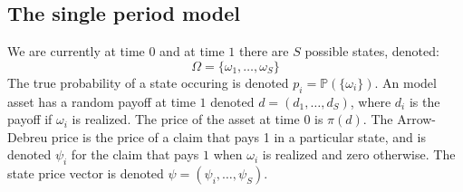 \documentclass[10pt,a4paper]{article}
\begin{document}
    \subsection{The single period model}
        We are currently at time $0$ and at time $1$ there are $S$ possible states, denoted:
            \begin{equation}
                \Omega = \{\omega_{1}, \dots, \omega_{S}\}
            \end{equation}
        The true probability of a state occuring is denoted $p_{i} = \mathbb{P}\left(\{\omega_{i}\}\right)$. An model asset has a random payoff at time $1$ denoted $d=(d_{1}, \dots, d_{S})$, where $d_{i}$ is the payoff if $\omega_{i}$ is realized. The price of the asset at time $0$ is $\pi(d)$. The Arrow-Debreu price is the price of a claim that pays 1 in a particular state, and is denoted $\psi_{i}$ for the claim that pays $1$ when $\omega_{i}$ is realized and zero otherwise. The state price vector is denoted $\psi = (\psi_{i}, \dots, \psi_{S})$.
\end{document}
